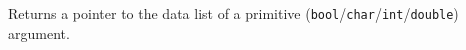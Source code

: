 \documentclass{article}
\newenvironment{code}{
       \begin{list}{}{
               \setlength{\leftmargin}{.4in}
               \setlength{\rightmargin}{0in}
               \setlength{\topsep}{.2in}
       }
       \small
       \item[] }
       { \end{list}   }
\begin{document}
Returns a pointer to the data list of a primitive (\verb#bool#/\verb#char#/\verb#int#/\verb#double#) argument.\\




%
%
%
%
%
%
%    
%    
%
\end{document}
